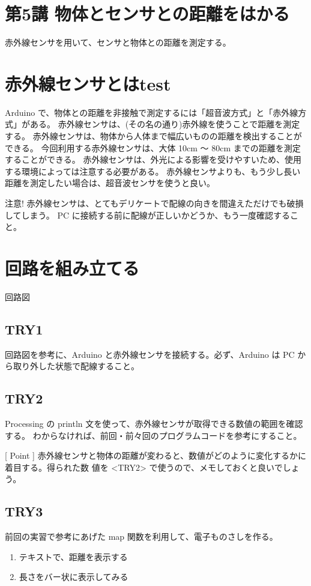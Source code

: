 \documentclass[11pt,a4paper]{jarticle}
\begin{document}
\section*{\LARGE{第5講 物体とセンサとの距離をはかる}}
赤外線センサを用いて、センサと物体との距離を測定する。


\section{赤外線センサとはtest}
Arduino で、物体との距離を非接触で測定するには「超音波方式」と「赤外線方式」がある。
赤外線センサは、(その名の通り)赤外線を使うことで距離を測定する。
赤外線センサは、物体から人体まで幅広いものの距離を検出することができる。
今回利用する赤外線センサは、大体 10cm 〜 80cm までの距離を測定することができる。
赤外線センサは、外光による影響を受けやすいため、使用する環境によっては注意する必要がある。
赤外線センサよりも、もう少し長い距離を測定したい場合は、超音波センサを使うと良い。

\begin{itembox}{注意!}
 赤外線センサは、とてもデリケートで配線の向きを間違えただけでも破損してしまう。
 PC に接続する前に配線が正しいかどうか、もう一度確認すること。
\end{itembox}

\section{回路を組み立てる}

回路図

\subsection*{TRY1}
回路図を参考に、Arduino と赤外線センサを接続する。必ず、Arduino は PC から取り外した状態で配線すること。

\subsection*{TRY2}
Processing の println 文を使って、赤外線センサが取得できる数値の範囲を確認する。
わからなければ、前回・前々回のプログラムコードを参考にすること。

[ Point ]
 赤外線センサと物体の距離が変わると、数値がどのように変化するかに着目する。得られた数
値を <TRY2> で使うので、メモしておくと良いでしょう。

\subsection*{TRY3}
前回の実習で参考にあげた map 関数を利用して、電子ものさしを作る。
\begin{enumerate}
 \item テキストで、距離を表示する
 \item 長さをバー状に表示してみる
\end{enumerate}
\end{document}
